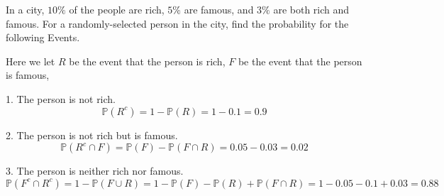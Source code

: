 \begin{eg}
In a city, \(10\%\) of the people are rich, \(5\%\) are famous, and \(3\%\) are both rich and famous. For a randomly-selected person in the city, find the probability for the following Events. 

Here we let \(R\) be the event that the person is rich, \(F\) be the event that the person is famous, 

1. The person is not rich.
\[
    \mathbb{P}(R^c) = 1 - \mathbb{P}(R) = 1 - 0.1 = 0.9
\]

2. The person is not rich but is famous.
\[
    \mathbb{P}(R^c \cap F) = \mathbb{P}(F) - \mathbb{P}(F \cap R) = 0.05 - 0.03 = 0.02
\]

3. The person is neither rich nor famous.
\[
    \mathbb{P}(F^c \cap R^c) = 1 - \mathbb{P}(F \cup R) = 1 - \mathbb{P}(F) - \mathbb{P}(R) + \mathbb{P}(F \cap R) = 1 - 0.05 - 0.1 + 0.03 = 0.88
\]
\end{eg}

